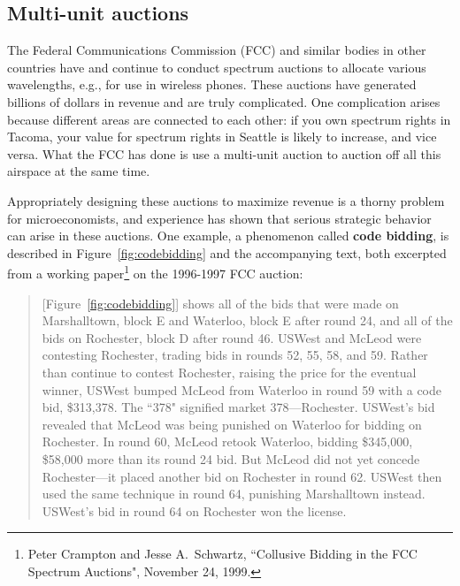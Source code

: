 \subsection*{Multi-unit auctions}

The Federal Communications Commission (FCC) and similar bodies in other countries have and continue to conduct spectrum auctions to allocate various wavelengths, e.g., for use in wireless phones. These auctions have generated billions of dollars in revenue and are truly complicated. One complication arises because different areas are connected to each other: if you own spectrum rights in Tacoma, your value for spectrum rights in Seattle is likely to increase, and vice versa. What the FCC has done is use a multi-unit auction to auction off all this airspace at the same time.

Appropriately designing these auctions to maximize revenue is a thorny problem for microeconomists, and experience has shown that serious strategic behavior can arise in these auctions. One example, a phenomenon called \textbf{code bidding}, is described in Figure~\ref{fig:codebidding} and the accompanying text, both excerpted from a working paper\footnote{Peter Crampton and Jesse A.\ Schwartz, ``Collusive Bidding in the FCC Spectrum Auctions", November 24, 1999.} on the 1996-1997 FCC auction:
\begin{quote}
[Figure~\ref{fig:codebidding}] shows all of the bids that were made on Marshalltown, block E and Waterloo, block E after round 24, and all of the bids on Rochester, block D after round 46. USWest and McLeod were contesting Rochester, trading bids in rounds 52, 55, 58, and 59. Rather than continue to contest Rochester, raising the price for the eventual winner, USWest bumped McLeod from Waterloo in round 59 with a code bid, \$313,378. The ``378" signified market 378---Rochester. USWest's bid revealed that McLeod was being punished on Waterloo for bidding on Rochester. In round 60, McLeod retook Waterloo, bidding \$345,000, \$58,000 more than its round 24 bid. But McLeod did not yet concede Rochester---it placed another bid on Rochester in round 62. USWest then used the same technique in round 64, punishing Marshalltown instead. USWest's bid in round 64 on Rochester won the license.
\end{quote}


